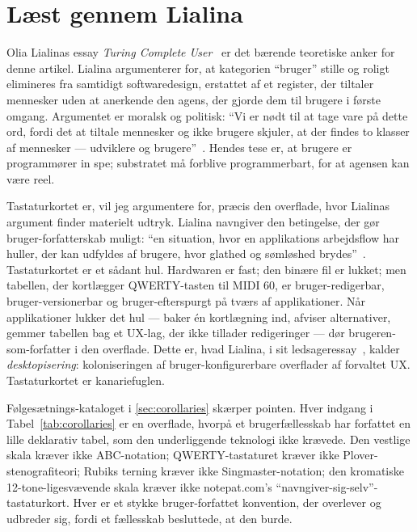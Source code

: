 \documentclass[10pt,letterpaper,twocolumn]{article}
\DeclareRobustCommand{\key}[1]{\tikz[baseline=(k.base)]{%
 \node[fill=keystroke, rounded corners=1.3pt, inner xsep=2.4pt,
    inner ysep=1.9pt, anchor=base, yshift=-1.2pt] at (0,0)
  {\footnotesize\ttfamily\bfseries\vphantom{A}\phantom{#1}};
 \node[draw=keystroke, line width=0.4pt, fill=keyfill,
    rounded corners=1.3pt, inner xsep=2.4pt, inner ysep=1.9pt,
    anchor=base] (k) at (0,0)
  {\footnotesize\ttfamily\bfseries\vphantom{A}#1};}}
\begin{document}
\section{Læst gennem Lialina}
\label{sec:lialina}

Olia Lialinas essay \emph{Turing Complete User}~\citep{lialina2012turing,lialina2021turingbook} er det bærende teoretiske anker for denne artikel. Lialina argumenterer for, at kategorien ``bruger'' stille og roligt elimineres fra samtidigt softwaredesign, erstattet af et register, der tiltaler mennesker uden at anerkende den agens, der gjorde dem til brugere i første omgang. Argumentet er moralsk og politisk: ``Vi er nødt til at tage vare på dette ord, fordi det at tiltale mennesker og ikke brugere skjuler, at der findes to klasser af mennesker --- udviklere og brugere''~\citep{lialina2012turing}. Hendes tese er, at brugere er programmører in spe; substratet må forblive programmerbart, for at agensen kan være reel.

Tastaturkortet er, vil jeg argumentere for, præcis den overflade, hvor Lialinas argument finder materielt udtryk. Lialina navngiver den betingelse, der gør bruger-forfatterskab muligt: ``en situation, hvor en applikations arbejdsflow har huller, der kan udfyldes af brugere, hvor glathed og sømløshed brydes''~\citep{lialina2012turing}. Tastaturkortet er et sådant hul. Hardwaren er fast; den binære fil er lukket; men tabellen, der kortlægger QWERTY-tasten \key{A} til MIDI 60, er bruger-redigerbar, bruger-versionerbar og bruger-efterspurgt på tværs af applikationer. Når applikationer lukker det hul --- baker én kortlægning ind, afviser alternativer, gemmer tabellen bag et UX-lag, der ikke tillader redigeringer --- dør brugeren-som-forfatter i den overflade. Dette er, hvad Lialina, i sit ledsageressay~\citep{lialina2018rich}, kalder \emph{desktopisering}: koloniseringen af bruger-konfigurerbare overflader af forvaltet UX. Tastaturkortet er kanariefuglen.

Følgesætnings-kataloget i \textsection\ref{sec:corollaries} skærper pointen. Hver indgang i Tabel~\ref{tab:corollaries} er en overflade, hvorpå et brugerfællesskab har forfattet en lille deklarativ tabel, som den underliggende teknologi ikke krævede. Den vestlige skala kræver ikke ABC-notation; QWERTY-tastaturet kræver ikke Plover-stenografiteori; Rubiks terning kræver ikke Singmaster-notation; den kromatiske 12-tone-ligesvævende skala kræver ikke notepat.com's ``navngiver-sig-selv''-tastaturkort. Hver er et stykke bruger-forfattet konvention, der overlever og udbreder sig, fordi et fællesskab besluttede, at den burde.
\end{document}
